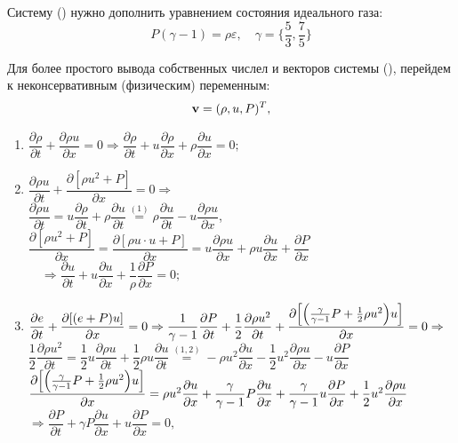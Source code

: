 \documentclass[12pt,a4paper]{article}
\newcommand{\dhalf}{\dfrac{1}{2}}
\newcommand{\dpartial}[2]{\dfrac{ \partial #1 }{ \partial #2 }}
\begin{document}
    Систему () нужно дополнить уравнением состояния идеального газа:
    \begin{equation}
        \label{eq:gas}
        P (\gamma - 1) = \rho \varepsilon, \quad \gamma = \Biggl\{ \dfrac{5}{3}, \dfrac{7}{5} \Biggr\}
    \end{equation}

    Для более простого вывода собственных числел и векторов системы (), перейдем к неконсервативным (физическим) переменным:
    \begin{equation} 
        \label{var1d:phys}
        \bold v = (\rho, u, P)^T,
    \end{equation}

    \begin{enumerate}
        \item $ \dfrac{\partial \rho}{\partial t} + \dfrac{\partial \rho u}{\partial x} = 0 \Rightarrow \dfrac{\partial \rho}{\partial t} + u \dfrac{\partial \rho}{\partial x} + \rho \dpartial{u}{x} = 0;$ \\[0.5em]
        
        \item $ \dpartial{\rho u}{t} + \dpartial{[\rho u^2 + P]}{x} = 0 \Rightarrow $ \\[2mm]
        $ \dpartial{\rho u}{t} = u \dpartial{\rho}{t} + \rho \dpartial{u}{t} \overset{(1)}{=} \rho \dpartial{u}{t} - u \dpartial{\rho u}{x} $, \\[3mm]
        $ \dpartial{[\rho u^2 + P]}{x} = \dpartial{[\rho u \cdot u + P]}{x} = u \dpartial{\rho u}{x} + \rho u \dpartial{u}{x} + \dpartial{P}{x} $ \\[3mm]
        $ \quad \Rightarrow \dpartial{u}{t} + u \dpartial{u}{x} + \dfrac{1}{\rho} \dpartial{P}{x}= 0; $ \\[0.2em]

        \item $ \dpartial{e}{t} + \dpartial{[(e+ P) u]}{x} = 0 \Rightarrow \dfrac{1}{\gamma - 1} \dpartial{P}{t} + \dfrac{1}{2} \dpartial{\rho u^2}{t} + \dpartial{\Bigl[ \Bigl( \tfrac{\gamma}{\gamma - 1} P + \tfrac{1}{2} \rho u^2 \Bigr) u \Bigr]}{x} = 0 \Rightarrow $ \\[2mm]
        $\dfrac{1}{2} \dpartial{\rho u^2}{t} = \dhalf u \dpartial{\rho u}{t} + \dhalf \rho u \dpartial{u}{t} \overset{(1, 2)}{=} - \rho u^2 \dpartial{u}{x} - \dhalf u^2 \dpartial{\rho u}{x} - u \dpartial{P}{x} $ \\[3mm]
        $ \dpartial{\Bigl[ \Bigl( \tfrac{\gamma}{\gamma - 1} P + \tfrac{1}{2} \rho u^2 \Bigr) u \Bigr]}{x} = \rho u^2 \dpartial{u}{x} + \dfrac{\gamma}{\gamma - 1} P \dpartial{u}{x} + \dfrac{\gamma}{\gamma - 1} u \dpartial{P}{x} + \dhalf u^2 \dpartial{\rho u}{x}$ \\[2mm]
        $ \Rightarrow \dpartial{P}{t} + \gamma P \dpartial{u}{x} + u \dpartial{P}{x} = 0, $ \\
      \end{enumerate}  
\end{document}
